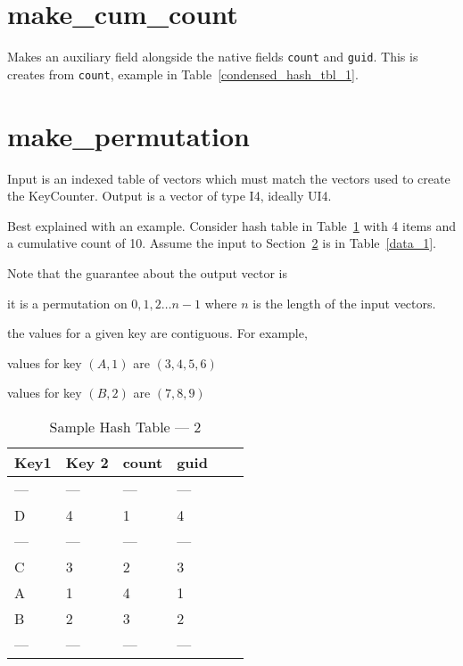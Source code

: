 \section{make\_cum\_count}
\label{make_cum_count}

Makes an auxiliary field alongside the native fields {\tt count}
and {\tt guid}. This is creates from {\tt count}, example in 
Table~\ref{condensed_hash_tbl_1}.

\section{make\_permutation}
\label{make_permutation}
Input is an indexed table of vectors which must match the vectors used to create
the KeyCounter. Output is a vector of type I4, ideally UI4.

Best explained with an example. 
Consider hash table in Table~\ref{hash_tbl_2} with 4 items and a 
cumulative count of 10. Assume the input to Section~\ref{make_permutation} is in
Table~\ref{data_1}. 

Note that the guarantee about the output vector is 
\be
\item it is a permutation on \(0, 1, 2 \ldots n-1\) where \(n\) is the length of the input vectors.
\item the values for a given key are contiguous. For example, 
\be
\item values for key \((A, 1)\) are \((3, 4, 5, 6)\)
\item values for key \((B, 2)\) are \((7, 8, 9)\)
\ee
\ee
\begin{table}
\centering
\begin{tabular}{|l|l||l|l|l||l|} \hline \hline 
{\bf Key1 } & {\bf Key 2} & {\bf count} & {\bf guid} \\ \hline \hline
--- & --- & --- & ---  \\ \hline
  D &  4  &  1  &  4   \\ \hline
--- & --- & --- & ---  \\ \hline
  C &  3  &  2  &  3   \\ \hline
  A &  1  &  4  &  1   \\ \hline
  B &  2  &  3  &  2   \\ \hline
--- & --- & --- & ---  \\ \hline
\hline
\end{tabular}
\caption{Sample Hash Table --- 2}
\label{hash_tbl_2}
\end{table}

